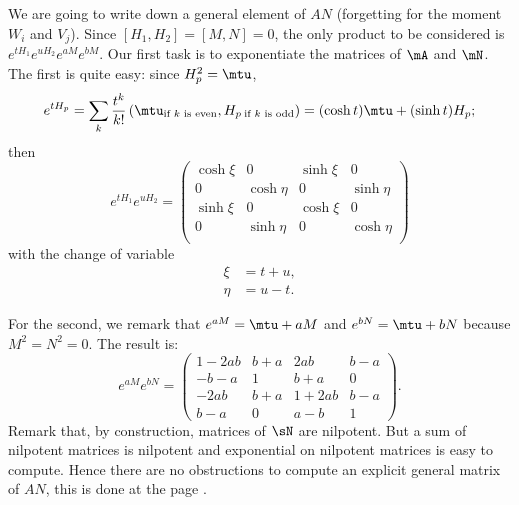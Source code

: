 \label{pg:exp_AN}
We are going to write down a general element of $AN$ (forgetting for the moment $W_i$ and $V_j$). Since $[H_1,H_2]=[M,N]=0$, the only product to be considered is $e^{tH_1}e^{uH_2}e^{aM}e^{bM}$.  Our first task is to exponentiate the matrices of $\mA$ and $\mN$. The first is quite easy: since $H_p^2=\mtu$, 
\[
  e^{tH_p}=\sum_k\frac{t^k}{k!}\left(  \mtu_{\text{if $k$ is even}}, {H_p}\,_{\text{if $k$ is odd}}  \right)
            =(\cosh t)\mtu+(\sinh t)H_p;
\]
then
\begin{equation}
e^{tH_1}e^{uH_2}=\begin{pmatrix}
  \cosh\xi &    0      & \sinh\xi &    0  \\
    0       & \cosh\eta &    0      & \sinh\eta \\
  \sinh\xi &    0      & \cosh\xi &    0     \\
    0       & \sinh\eta &    0      & \cosh\eta \\
                 \end{pmatrix}
\end{equation}
with the change of variable 
\begin{subequations}\label{eq:chm_xi_eta}
\begin{align}   
   \xi &=t+u,\\
   \eta &=u-t.
\end{align}   
\end{subequations}

For the second, we remark that $e^{aM}=\mtu+aM$ and $e^{bN}=\mtu+bN$ because $M^2=N^2=0$. The result is:
\begin{equation}
  e^{aM}e^{bN}=\begin{pmatrix}
                 1-2ab & b+a & 2ab   & b-a \\
 		 -b-a  & 1   & b+a   &  0   \\
		 -2ab  & b+a & 1+2ab &  b-a \\
		  b-a  &  0  &  a-b  &  1  
	      \end{pmatrix}.
\end{equation}
Remark that, by construction, matrices of $\sN$ are nilpotent. But a sum of nilpotent matrices is nilpotent and exponential on nilpotent matrices is easy to compute. Hence there are no obstructions to compute an explicit general matrix of $AN$, this is done at the page \pageref{PgExplAN}.

